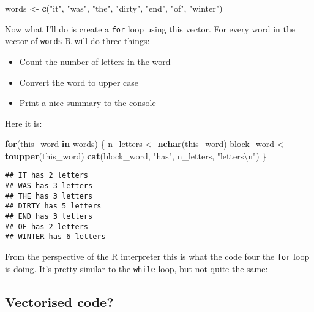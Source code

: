 \documentclass[]{book}
\newenvironment{Shaded}{\begin{snugshade}}{\end{snugshade}}
\newcommand{\CharTok}[1]{\textcolor[rgb]{0.31,0.60,0.02}{#1}}
\newcommand{\ControlFlowTok}[1]{\textcolor[rgb]{0.13,0.29,0.53}{\textbf{#1}}}
\newcommand{\KeywordTok}[1]{\textcolor[rgb]{0.13,0.29,0.53}{\textbf{#1}}}
\newcommand{\NormalTok}[1]{#1}
\newcommand{\StringTok}[1]{\textcolor[rgb]{0.31,0.60,0.02}{#1}}
\providecommand{\tightlist}{%
  \setlength{\itemsep}{0pt}\setlength{\parskip}{0pt}}
\begin{document}
\begin{Shaded}
\begin{Highlighting}[]
\NormalTok{words <-}\StringTok{ }\KeywordTok{c}\NormalTok{(}\StringTok{"it"}\NormalTok{, }\StringTok{"was"}\NormalTok{, }\StringTok{"the"}\NormalTok{, }\StringTok{"dirty"}\NormalTok{, }\StringTok{"end"}\NormalTok{, }\StringTok{"of"}\NormalTok{, }\StringTok{"winter"}\NormalTok{)}
\end{Highlighting}
\end{Shaded}

Now what I'll do is create a \texttt{for} loop using this vector. For every word in the vector of \texttt{words} R will do three things:

\begin{itemize}
\tightlist
\item
  Count the number of letters in the word
\item
  Convert the word to upper case
\item
  Print a nice summary to the console
\end{itemize}

Here it is:

\begin{Shaded}
\begin{Highlighting}[]
\ControlFlowTok{for}\NormalTok{(this_word }\ControlFlowTok{in}\NormalTok{ words) \{}
\NormalTok{  n_letters <-}\StringTok{ }\KeywordTok{nchar}\NormalTok{(this_word)}
\NormalTok{  block_word <-}\StringTok{ }\KeywordTok{toupper}\NormalTok{(this_word)}
  \KeywordTok{cat}\NormalTok{(block_word, }\StringTok{"has"}\NormalTok{, n_letters, }\StringTok{"letters}\CharTok{\textbackslash{}n}\StringTok{"}\NormalTok{)}
\NormalTok{\}}
\end{Highlighting}
\end{Shaded}

\begin{verbatim}
## IT has 2 letters
## WAS has 3 letters
## THE has 3 letters
## DIRTY has 5 letters
## END has 3 letters
## OF has 2 letters
## WINTER has 6 letters
\end{verbatim}

From the perspective of the R interpreter this is what the code four the \texttt{for} loop is doing. It's pretty similar to the \texttt{while} loop, but not quite the same:

\hypertarget{vectorised-code}{%
\subsection{Vectorised code?}\label{vectorised-code}}
\end{document}
